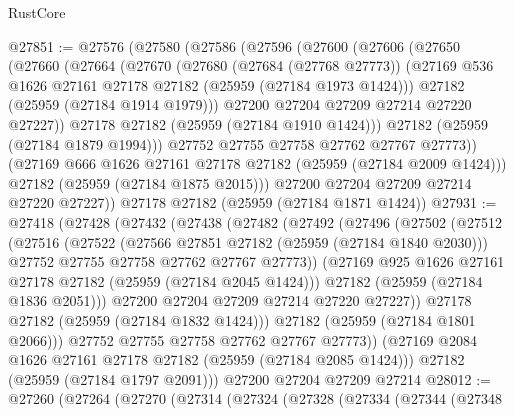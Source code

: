 \begin{lexlean}{RustCore}
\begin{coremodule}
@27851 := @27576
    (@27580
      (@27586
        (@27596
          (@27600
            (@27606
              (@27650
                (@27660
                  (@27664
                    (@27670
                      (@27680
                        (@27684 (@27768 @27773))
                        (@27169 @536 @1626 @27161 @27178 @27182 (@25959 (@27184 @1973 @1424)))
                        @27182
                        (@25959 (@27184 @1914 @1979)))
                      @27200
                      @27204
                      @27209
                      @27214
                      @27220
                      @27227))
                  @27178
                  @27182
                  (@25959 (@27184 @1910 @1424)))
                @27182
                (@25959 (@27184 @1879 @1994)))
              @27752
              @27755
              @27758
              @27762
              @27767
              @27773))
          (@27169 @666 @1626 @27161 @27178 @27182 (@25959 (@27184 @2009 @1424)))
          @27182
          (@25959 (@27184 @1875 @2015)))
        @27200
        @27204
        @27209
        @27214
        @27220
        @27227))
    @27178
    @27182
    (@25959 (@27184 @1871 @1424))
@27931 := @27418
    (@27428
      (@27432
        (@27438
          (@27482
            (@27492
              (@27496
                (@27502
                  (@27512
                    (@27516
                      (@27522
                        (@27566 @27851 @27182 (@25959 (@27184 @1840 @2030)))
                        @27752
                        @27755
                        @27758
                        @27762
                        @27767
                        @27773))
                    (@27169 @925 @1626 @27161 @27178 @27182 (@25959 (@27184 @2045 @1424)))
                    @27182
                    (@25959 (@27184 @1836 @2051)))
                  @27200
                  @27204
                  @27209
                  @27214
                  @27220
                  @27227))
              @27178
              @27182
              (@25959 (@27184 @1832 @1424)))
            @27182
            (@25959 (@27184 @1801 @2066)))
          @27752
          @27755
          @27758
          @27762
          @27767
          @27773))
      (@27169 @2084 @1626 @27161 @27178 @27182 (@25959 (@27184 @2085 @1424)))
      @27182
      (@25959 (@27184 @1797 @2091)))
    @27200
    @27204
    @27209
    @27214
@28012 := @27260
    (@27264
      (@27270
        (@27314
          (@27324
            (@27328
              (@27334
                (@27344
                  (@27348

\end{coremodule}
\end{lexlean}
